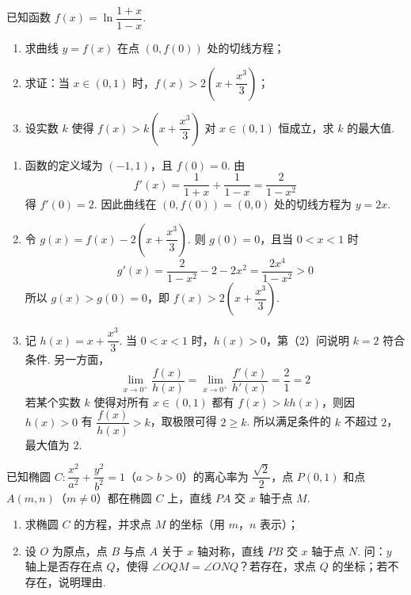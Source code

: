 \begin{problem}
已知函数 \(f(x)=\ln\dfrac{1+x}{1-x}\).

\begin{enumerate}
\item 求曲线 \(y=f(x)\) 在点 \((0,f(0))\) 处的切线方程；
\item 求证：当 \(x\in(0,1)\) 时，\(f(x)>2\left(x+\dfrac{x^3}{3}\right)\)；
\item 设实数 \(k\) 使得 \(f(x)>k\left(x+\dfrac{x^3}{3}\right)\) 对 \(x\in(0,1)\) 恒成立，求 \(k\) 的最大值.
\end{enumerate}
\end{problem}

\begin{solution}
\begin{enumerate}
\item 函数的定义域为 \((-1,1)\)，且 \(f(0)=0\). 由
\[
f'(x)=\frac{1}{1+x}+\frac{1}{1-x}=\frac{2}{1-x^2}
\]
得 \(f'(0)=2\). 因此曲线在 \((0,f(0))=(0,0)\) 处的切线方程为 \(y=2x\).
\item 令 \(g(x)=f(x)-2\left(x+\dfrac{x^3}{3}\right)\). 则 \(g(0)=0\)，且当 \(0<x<1\) 时
\[
g'(x)=\frac{2}{1-x^2}-2-2x^2
=\frac{2x^4}{1-x^2}>0
\]
所以 \(g(x)>g(0)=0\)，即 \(f(x)>2\left(x+\dfrac{x^3}{3}\right)\).
\item 记 \(h(x)=x+\dfrac{x^3}{3}\). 当 \(0<x<1\) 时，\(h(x)>0\)，第（2）问说明 \(k=2\) 符合条件. 另一方面，
\[
\lim_{x\to0^+}\frac{f(x)}{h(x)}
=\lim_{x\to0^+}\frac{f'(x)}{h'(x)}
=\frac{2}{1}=2
\]
若某个实数 \(k\) 使得对所有 \(x\in(0,1)\) 都有 \(f(x)>k h(x)\)，则因 \(h(x)>0\) 有 \(\dfrac{f(x)}{h(x)}>k\)，取极限可得 \(2\geqslant k\). 所以满足条件的 \(k\) 不超过 \(2\)，最大值为 \(2\).
\end{enumerate}
\end{solution}

\begin{problem}
已知椭圆 \(C:\dfrac{x^2}{a^2}+\dfrac{y^2}{b^2}=1\)（\(a>b>0\)）的离心率为 \(\dfrac{\sqrt{2}}{2}\)，点 \(P(0,1)\) 和点 \(A(m,n)\)（\(m\neq 0\)）都在椭圆 \(C\) 上，直线 \(PA\) 交 \(x\) 轴于点 \(M\).

\begin{enumerate}
\item 求椭圆 \(C\) 的方程，并求点 \(M\) 的坐标（用 \(m\)，\(n\) 表示）；
\item 设 \(O\) 为原点，点 \(B\) 与点 \(A\) 关于 \(x\) 轴对称，直线 \(PB\) 交 \(x\) 轴于点 \(N\). 问：\(y\) 轴上是否存在点 \(Q\)，使得 \(\angle OQM=\angle ONQ\)？若存在，求点 \(Q\) 的坐标；若不存在，说明理由.
\end{enumerate}
\end{problem}

